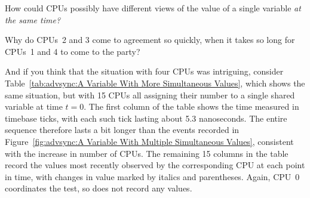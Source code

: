 \QuickQuiz{}
	How could CPUs possibly have different views of the
	value of a single variable \emph{at the same time?}
 \QuickQuizEnd

\QuickQuiz{}
	Why do CPUs~2 and 3 come to agreement so quickly, when it
	takes so long for CPUs~1 and 4 to come to the party?
 \QuickQuizEnd

And if you think that the situation with four CPUs was intriguing, consider
Table~\ref{tab:advsync:A Variable With More Simultaneous Values},
which shows the same situation, but with 15 CPUs all assigning their
number to a single shared variable at time $t=0$.
The first column of the table shows the time measured in
timebase ticks, with each such tick lasting about 5.3 nanoseconds.
The entire sequence therefore lasts a bit longer than the events recorded in
Figure~\ref{fig:advsync:A Variable With Multiple Simultaneous Values},
consistent with the increase in number of CPUs.
The remaining 15 columns in the table record the values most recently
observed by the corresponding CPU at each point in time, with changes
in value marked by italics and parentheses.
Again, CPU~0 coordinates the test, so does not record any values.

